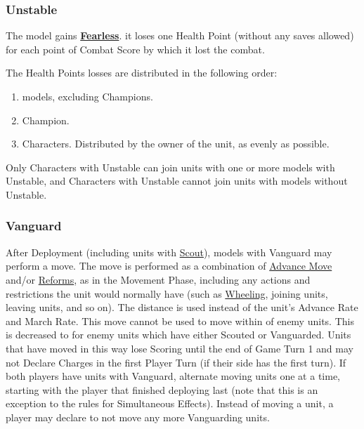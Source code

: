 \subsubsection{Unstable}
\label{unstable}

The model gains \hyperref[fearless]{\textbf{Fearless}}.  it loses one Health Point (without any saves allowed) for each point of Combat Score by which it lost the combat. 

The Health Points losses are distributed in the following order:
\begin{enumerate}
\item \rnf{} models, excluding Champions.
\item Champion.
\item Characters. Distributed by the owner of the unit, as evenly as possible.
\end{enumerate}

Only Characters with Unstable can join units with one or more models with Unstable, and Characters with Unstable cannot join units with models without Unstable​.

\subsubsection{Vanguard}
\label{vanguard}

After Deployment (including units with \hyperref[scout]{Scout}), models with Vanguard may perform a  move. The move is performed as a combination of \hyperref[advance_move]{Advance Move} and/or \hyperref[reform]{Reforms}, as in the Movement Phase, including any actions and restrictions the unit would normally have (such as \hyperref[pivots_and_wheels]{Wheeling}, joining units, leaving units, and so on). The  distance is used instead of the unit's Advance Rate and March Rate. This move cannot be used to move within  of enemy units. This is decreased to  for enemy units which have either Scouted or Vanguarded. Units that have moved in this way lose Scoring until the end of Game Turn 1 and may not Declare Charges in the first Player Turn (if their side has the first turn). If both players have units with Vanguard, alternate moving units one at a time, starting with the player that finished deploying last (note that this is an exception to the rules for Simultaneous Effects). Instead of moving a unit, a player may declare to not move any more Vanguarding units.

